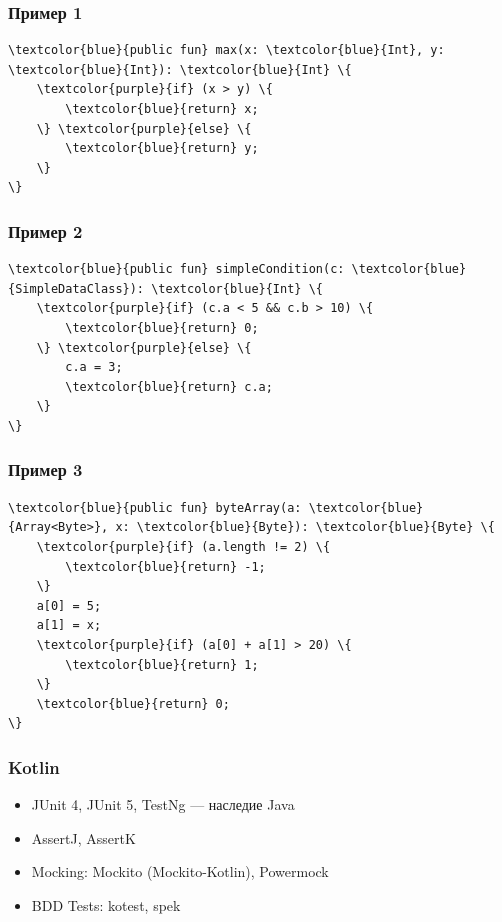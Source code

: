 \documentclass{beamer}
\begin{document}
\begin{frame}[fragile]
  \frametitle{Пример 1}
  \begin{Verbatim}[commandchars=\\\{\}]
\textcolor{blue}{public fun} max(x: \textcolor{blue}{Int}, y: \textcolor{blue}{Int}): \textcolor{blue}{Int} \{
    \textcolor{purple}{if} (x > y) \{
        \textcolor{blue}{return} x;
    \} \textcolor{purple}{else} \{
        \textcolor{blue}{return} y;
    \}
\}
  \end{Verbatim}
\end{frame}

\begin{frame}[fragile]
  \frametitle{Пример 2}
  \begin{Verbatim}[commandchars=\\\{\}]
\textcolor{blue}{public fun} simpleCondition(c: \textcolor{blue}{SimpleDataClass}): \textcolor{blue}{Int} \{
    \textcolor{purple}{if} (c.a < 5 && c.b > 10) \{
        \textcolor{blue}{return} 0;
    \} \textcolor{purple}{else} \{
        c.a = 3;
        \textcolor{blue}{return} c.a;
    \}
\}
  \end{Verbatim}
\end{frame}

\begin{frame}[fragile]
  \frametitle{Пример 3}
  \begin{Verbatim}[commandchars=\\\{\}]
\textcolor{blue}{public fun} byteArray(a: \textcolor{blue}{Array<Byte>}, x: \textcolor{blue}{Byte}): \textcolor{blue}{Byte} \{
    \textcolor{purple}{if} (a.length != 2) \{
        \textcolor{blue}{return} -1;
    \}
    a[0] = 5;
    a[1] = x;
    \textcolor{purple}{if} (a[0] + a[1] > 20) \{
        \textcolor{blue}{return} 1;
    \}
    \textcolor{blue}{return} 0;
\}
  \end{Verbatim}
\end{frame}

\begin{frame}
  \frametitle{Kotlin}
  \begin{itemize}
    \item JUnit 4, JUnit 5, TestNg --- наследие Java
    \item AssertJ, AssertK
    \item Mocking: Mockito (Mockito-Kotlin), Powermock
    \item BDD Tests: kotest, spek
  \end{itemize}
\end{frame}
\end{document}
